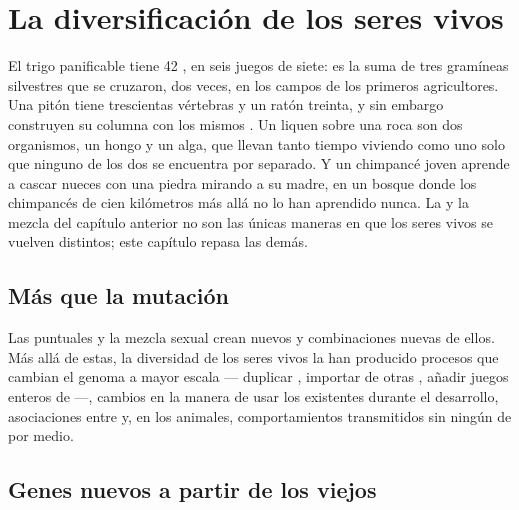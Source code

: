\chapter{La diversificación de los seres vivos}\label{ch:g12:diversification-of-life}

El trigo panificable tiene 42 , en seis juegos de siete: es
la suma de tres gramíneas silvestres que se cruzaron, dos veces, en los
campos de los primeros agricultores. Una pitón tiene trescientas
vértebras y un ratón treinta, y sin embargo construyen su columna con
los mismos . Un liquen sobre una roca son dos organismos, un hongo
y un alga, que llevan tanto tiempo viviendo como uno solo que ninguno
de los dos se encuentra por separado. Y un chimpancé joven aprende a
cascar nueces con una piedra mirando a su madre, en un bosque donde los
chimpancés de cien kilómetros más allá no lo han aprendido nunca. La
 y la mezcla del capítulo anterior no son las únicas maneras en
que los seres vivos se vuelven distintos; este capítulo repasa las
demás.

\section{Más que la mutación}

\begin{proposition}\label{prop:g12:diversification-of-life:sources}
Las  puntuales y la mezcla sexual crean  nuevos y
combinaciones nuevas de ellos. Más allá de estas, la diversidad de los
seres vivos la han producido procesos que cambian el genoma a mayor
escala --- duplicar , importar  de otras , añadir
juegos enteros de  ---, cambios en la manera de usar los
 existentes durante el desarrollo, asociaciones entre  y,
en los animales, comportamientos transmitidos sin ningún  de por
medio.
\end{proposition}
\admitted

\section{Genes nuevos a partir de los viejos}

